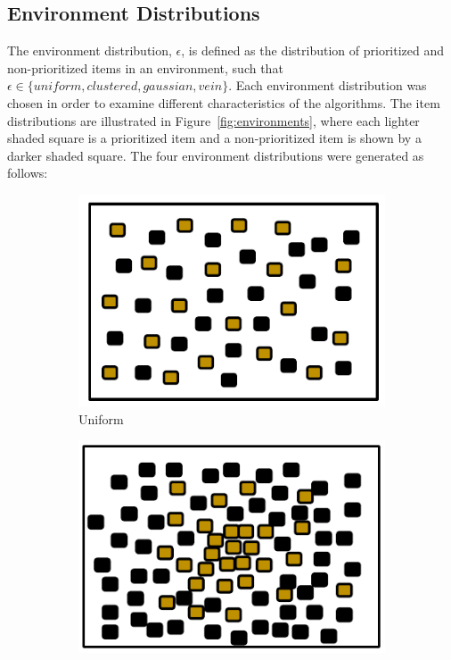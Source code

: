 \subsection{Environment Distributions}
\label{environmentdistributions}
The environment distribution, $\epsilon$, is defined as the distribution of prioritized and non-prioritized items in an environment, such that $\epsilon\in\{uniform, clustered, gaussian, vein\}$. Each environment distribution was chosen in order to examine different characteristics of the algorithms. The item distributions are illustrated in Figure~\ref{fig:environments}, where each lighter shaded square is a prioritized item and a non-prioritized item is shown by a darker shaded square. The four environment distributions were generated as follows:

\begin{figure} [h]
        \centering
        \begin{subfigure}[b]{0.21\textwidth}
                \includegraphics[width=\textwidth]{chapters/chapter4/figures/uniformenv.pdf}
                \caption{Uniform}
                \label{fig:uniformenv}
        \end{subfigure}%
		\begin{subfigure}[b]{0.2\textwidth}
                        \includegraphics[width=\textwidth]{chapters/chapter4/figures/gaussianenv}

\end{subfigure}
\end{figure}
